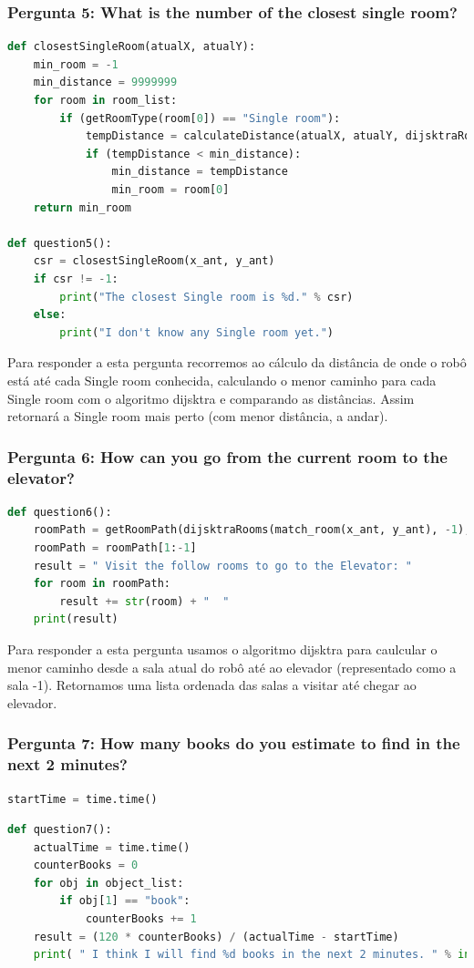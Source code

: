 \documentclass{article}
\begin{document}
\subsubsection{Pergunta 5: What is the number of the closest single room?}
\begin{lstlisting}[language=Python]
  def closestSingleRoom(atualX, atualY):
	min_room = -1
	min_distance = 9999999
	for room in room_list:
		if (getRoomType(room[0]) == "Single room"):
			tempDistance = calculateDistance(atualX, atualY, dijsktraRooms(match_room(atualX, atualY), room[0]))
			if (tempDistance < min_distance):
				min_distance = tempDistance
				min_room = room[0]
	return min_room

def question5():
	csr = closestSingleRoom(x_ant, y_ant)
	if csr != -1:
		print("The closest Single room is %d." % csr)
	else:
		print("I don't know any Single room yet.")
\end{lstlisting}

Para responder a esta pergunta recorremos ao cálculo da distância de onde o robô está até cada Single room conhecida, calculando o menor caminho para cada Single room com o algoritmo dijsktra e comparando as distâncias.
Assim retornará a Single room mais perto (com menor distância, a andar).

\subsubsection{Pergunta 6: How can you go from the current room to the elevator?}
\begin{lstlisting}[language=Python]
  def question6():
	roomPath = getRoomPath(dijsktraRooms(match_room(x_ant, y_ant), -1), match_room(x_ant, y_ant))
	roomPath = roomPath[1:-1]
	result = " Visit the follow rooms to go to the Elevator: "
	for room in roomPath:
		result += str(room) + "  "
	print(result)
\end{lstlisting}

Para responder a esta pergunta usamos o algoritmo dijsktra para caulcular o menor caminho desde a sala atual do robô até ao elevador (representado como a sala -1). Retornamos uma lista ordenada das salas a visitar até chegar ao elevador.

\subsubsection{Pergunta 7: How many books do you estimate to find in the next 2 minutes?}
\begin{lstlisting}[language=Python]
  startTime = time.time()
\end{lstlisting}
\begin{lstlisting}[language=Python]
  def question7():
	actualTime = time.time()
	counterBooks = 0
	for obj in object_list:
		if obj[1] == "book":
			counterBooks += 1
	result = (120 * counterBooks) / (actualTime - startTime)
	print( " I think I will find %d books in the next 2 minutes. " % int(result))
\end{lstlisting}
\end{document}
